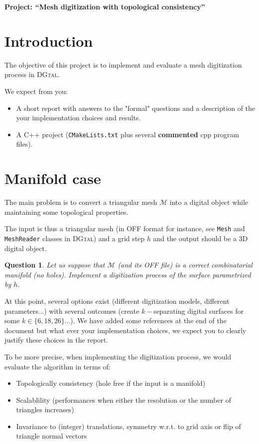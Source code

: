 \documentclass[a4paper, 11pt]{article}
\title{}
\author{}
\date{}
\newtheorem{qu}{Question}
\begin{document}
\begin{center}
	\LARGE \textbf{Project: ``Mesh digitization with topological consistency''}
\end{center}

\section*{Introduction} 

The objective of this project is to implement and evaluate a mesh
digitization process in \textsc{DGtal}.

We expect from you:
\begin{itemize}
\item A short report with answers to the "formal" questions and a
  description of the your implementation choices and results.
\item A C++ project (\texttt{CMakeLists.txt} plus several
  \textbf{commented} cpp program files).
\end{itemize}


\section{Manifold case}

The main problem is to convert a triangular mesh $\mathcal{M}$ into a
digital object while maintaining some topological properties.

The input is thus a triangular mesh (in OFF format for instance, see
\texttt{Mesh} and \texttt{MeshReader} classes in \textsc{DGtal}) and a
grid step $h$ and the output should be a 3D digital object.


\begin{qu}
  Let us suppose that $\mathcal{M}$ (and its OFF file) is a correct
  combinatorial manifold (no holes). Implement a digitization process
  of the surface parametrized by $h$.
\end{qu}


At this point, several options exist (different digitization models,
different parameters...) with several outcomes (create $k-$separating
digital surfaces for some $k\in\{6,18,26\}$...). We have added some
references at the end of the document but what ever your
implementation choices,  we expect you to clearly justify these
choices in the report.

To be more precise, when implementing the digitization process, we
would evaluate the algorithm in terms of:
\begin{itemize}
\item Topologically consistency (hole free if the input is a manifold)
\item Scalablility (performances when either the resolution or the
  number of triangles increases)
\item Invariance to (integer) translations, symmetry w.r.t. to grid axis or flip of triangle normal
  vectors
\end{itemize}
\end{document}
